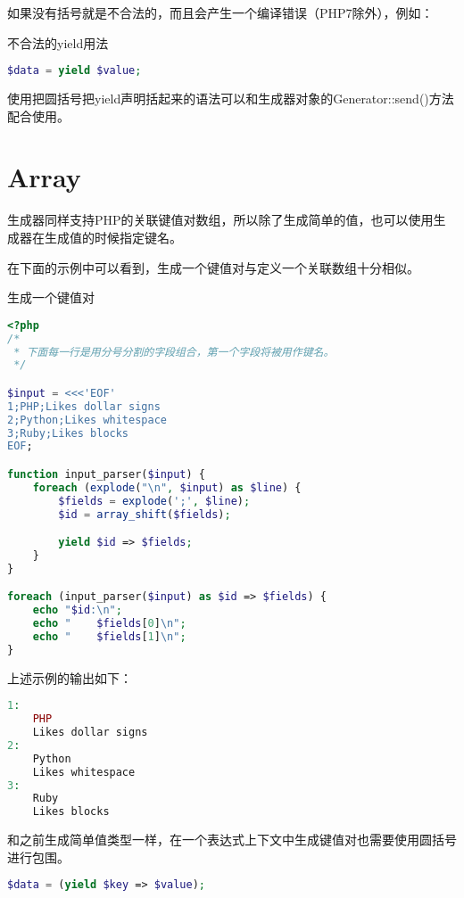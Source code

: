 如果没有括号就是不合法的，而且会产生一个编译错误（PHP7除外），例如：

\begin{example}
不合法的yield用法
\begin{lstlisting}[language=PHP]
$data = yield $value;
\end{lstlisting}
\end{example}

使用把圆括号把yield声明括起来的语法可以和生成器对象的Generator::send()方法配合使用。


\section{Array}


生成器同样支持PHP的关联键值对数组，所以除了生成简单的值，也可以使用生成器在生成值的时候指定键名。

在下面的示例中可以看到，生成一个键值对与定义一个关联数组十分相似。

\begin{example}
生成一个键值对
\begin{lstlisting}[language=PHP]
<?php
/* 
 * 下面每一行是用分号分割的字段组合，第一个字段将被用作键名。
 */

$input = <<<'EOF'
1;PHP;Likes dollar signs
2;Python;Likes whitespace
3;Ruby;Likes blocks
EOF;

function input_parser($input) {
    foreach (explode("\n", $input) as $line) {
        $fields = explode(';', $line);
        $id = array_shift($fields);

        yield $id => $fields;
    }
}

foreach (input_parser($input) as $id => $fields) {
    echo "$id:\n";
    echo "    $fields[0]\n";
    echo "    $fields[1]\n";
}
\end{lstlisting}
\end{example}

上述示例的输出如下：

\begin{lstlisting}[language=PHP]
1:
    PHP
    Likes dollar signs
2:
    Python
    Likes whitespace
3:
    Ruby
    Likes blocks
\end{lstlisting}


和之前生成简单值类型一样，在一个表达式上下文中生成键值对也需要使用圆括号进行包围。


\begin{lstlisting}[language=PHP]
$data = (yield $key => $value);
\end{lstlisting}


